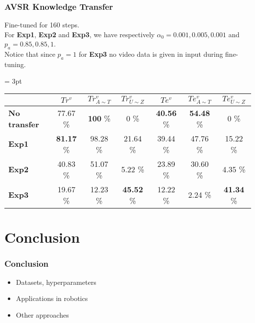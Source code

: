 \begin{frame}
  \frametitle{AVSR Knowledge Transfer}
    Fine-tuned for 160 steps.\\
    For \textbf{Exp1}, \textbf{Exp2} and \textbf{Exp3}, we have respectively
    $\alpha_0 = 0.001, 0.005, 0.001$ and $p_a = 0.85, 0.85, 1$.\\
    Notice that since $p_a = 1$ for \textbf{Exp3} no video data is given
    in input during fine-tuning.
  \begin{table}[H]
    \tabcolsep = 3pt
    \begin{tabular*}{\linewidth}{>{\bf}lcccccc}
      \toprule
      & $Tr^v$ & $Tr^v_{A\sim T}$ & $Tr^v_{U\sim Z}$
      & $Te^v$ & $Te^v_{A\sim T}$ & $Te^v_{U\sim Z}$\\
      \midrule
      No transfer & 77.67 \% & \textbf{100} \% & 0 \% & \textbf{40.56} \%
      & \textbf{54.48} \% & 0 \% \\
      Exp1 & \textbf{81.17} \% & 98.28 \% & 21.64 \% & 39.44 \%
      & 47.76 \% & 15.22 \% \\
      Exp2 &  40.83 \% & 51.07 \% & 5.22 \% & 23.89 \%
      & 30.60 \% & 4.35 \% \\
      Exp3 & 19.67 \% & 12.23 \% & \textbf{45.52} \% & 12.22 \%
      & 2.24 \% & \textbf{41.34} \% \\
      \bottomrule
    \end{tabular*}
  \end{table}
\end{frame}

\section{Conclusion}

\begin{frame}
  \frametitle{Conclusion}
  \begin{itemize}
    \item Datasets, hyperparameters
    \item Applications in robotics
    \item Other approaches
  \end{itemize}
\end{frame}
